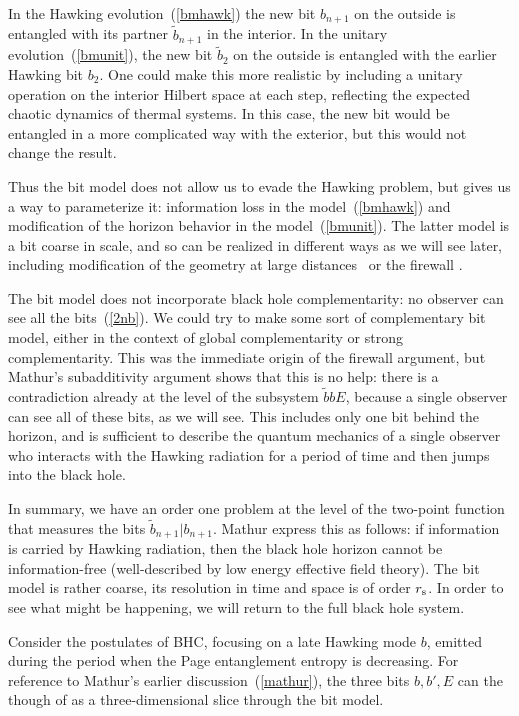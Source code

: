 \documentclass[12pt]{article}
\newcommand{\rmx}{\rm}
\newcommand{\rs}{r_{\rmx s}}
\begin{document}
In the Hawking evolution~(\ref{bmhawk}) the new bit $b_{n+1}$ on the outside is entangled with its partner $\tilde b_{n+1}$ in the interior.  In the unitary evolution~(\ref{bmunit}), the new bit $\tilde b_2$ on the outside is entangled with the earlier Hawking bit $b_2$.  One could make this more realistic by including a unitary operation on the interior Hilbert space at each step, reflecting the expected chaotic dynamics of thermal systems.  In this case, the new bit would be entangled in a more complicated way with the exterior, but this would not change the result.

Thus the bit model does not allow us to evade the Hawking problem, but gives us a way to parameterize it: information loss in the model~(\ref{bmhawk}) and modification of the horizon behavior in the model~(\ref{bmunit}).  The latter model is a bit coarse in scale, and so can be realized in different ways as we will see later, including modification of the geometry at large distances~\cite{Giddings:2012gc} or the firewall
\cite{Almheiri:2013hfa}.

The bit model does not incorporate black hole complementarity: no observer can see all the bits~(\ref{2nb}).  We could try to make some sort of complementary bit model, either in the context of global complementarity or strong complementarity.  This was the immediate origin of the firewall argument, but Mathur's subadditivity argument shows that this is no help: there is a contradiction already at the level of the subsystem $\tilde bbE$, because a single observer can see all of these bits, as we will see.  This includes only one bit behind the horizon, and is sufficient  to describe the quantum mechanics of a single observer who interacts with the Hawking radiation for a period of time and then jumps into the black hole.

In summary, we have an order one problem at the level of the two-point function that measures the bits $\tilde b_{n+1} | b_{n+1}$.  Mathur express this as follows: if information is carried by Hawking radiation, then the black hole horizon cannot be information-free (well-described by low energy effective field theory).  The bit model is rather coarse, its resolution in time and space is of order $\rs$.  In order to see what might be happening, we will return to the full black hole system.

Consider the postulates of BHC, focusing on a late Hawking mode $b$, emitted during the period when the Page entanglement entropy is decreasing.  For reference to Mathur's earlier discussion~(\ref{mathur}), the three bits $b,b',E$ can the though of as a three-dimensional slice through the bit model.
\end{document}
